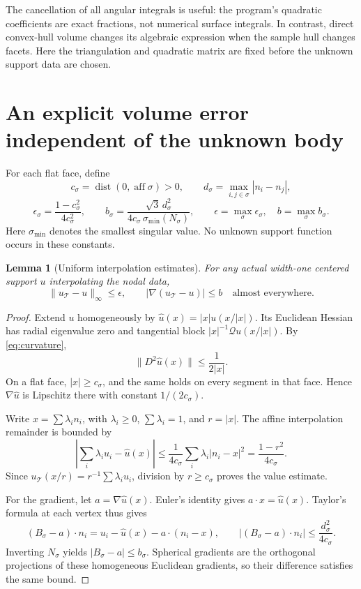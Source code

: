 \documentclass[11pt]{article}
\newtheorem{lemma}[theorem]{Lemma}
\theoremstyle{remark}\newtheorem{remark}[theorem]{Remark}
\newcommand{\Q}{\mathcal Q}
\numberwithin{equation}{section}
\begin{document}
The cancellation of all angular integrals is useful: the program's
quadratic coefficients are exact fractions, not numerical surface integrals.
In contrast, direct convex-hull volume changes its algebraic expression
when the sample hull changes facets. Here the triangulation and quadratic
matrix are fixed before the unknown support data are chosen.

\section{An explicit volume error independent of the unknown body}\label{sec:error}
For each flat face, define
\[
 c_\sigma=\operatorname{dist}(0,\operatorname{aff}\sigma)>0,\qquad
 d_\sigma=\max_{i,j\in\sigma}|n_i-n_j|,
\]
\begin{equation}\label{eq:errors}
 \epsilon_\sigma=\frac{1-c_\sigma^2}{4c_\sigma^2},\qquad
 b_\sigma=\frac{\sqrt3\,d_\sigma^2}
 {4c_\sigma\,\sigma_{\min}(N_\sigma)},\qquad
 \epsilon=\max_\sigma\epsilon_\sigma,\quad b=\max_\sigma b_\sigma.
\end{equation}
Here $\sigma_{\min}$ denotes the smallest singular value.
No unknown support function occurs in these constants.

\begin{lemma}[Uniform interpolation estimates]\label{lem:interperror}
For any actual width-one centered support $u$ interpolating the nodal data,
\begin{equation}\label{eq:interperror}
 \|u_{\mathcal T}-u\|_\infty\le\epsilon,
 \qquad |\nabla(u_{\mathcal T}-u)|\le b
 \quad\text{almost everywhere}.
\end{equation}
\end{lemma}
\begin{proof}
Extend $u$ homogeneously by $\widehat u(x)=|x|u(x/|x|)$.
Its Euclidean Hessian has radial eigenvalue zero and tangential block
$|x|^{-1}\Q u(x/|x|)$. By \cref{eq:curvature},
\[
 \|D^2\widehat u(x)\|\le\frac1{2|x|}.
\]
On a flat face, $|x|\ge c_\sigma$, and the same holds on every segment in
that face. Hence $\nabla\widehat u$ is Lipschitz there with constant
$1/(2c_\sigma)$.

Write $x=\sum\lambda_i n_i$, with $\lambda_i\ge0$, $\sum\lambda_i=1$, and
$r=|x|$. The affine interpolation remainder is bounded by
\[
 \left|\sum_i\lambda_i u_i-\widehat u(x)\right|
 \le\frac1{4c_\sigma}\sum_i\lambda_i|n_i-x|^2
 =\frac{1-r^2}{4c_\sigma}.
\]
Since $u_{\mathcal T}(x/r)=r^{-1}\sum\lambda_i u_i$, division by
$r\ge c_\sigma$ proves the value estimate.

For the gradient, let $a=\nabla\widehat u(x)$. Euler's identity gives
$a\cdot x=\widehat u(x)$. Taylor's formula at each vertex thus gives
\[
 (B_\sigma-a)\cdot n_i
 =u_i-\widehat u(x)-a\cdot(n_i-x),
 \qquad |(B_\sigma-a)\cdot n_i|
 \le\frac{d_\sigma^2}{4c_\sigma}.
\]
Inverting $N_\sigma$ yields $|B_\sigma-a|\le b_\sigma$.
Spherical gradients are the orthogonal projections of these homogeneous
Euclidean gradients, so their difference satisfies the same bound.
\end{proof}
\end{document}
